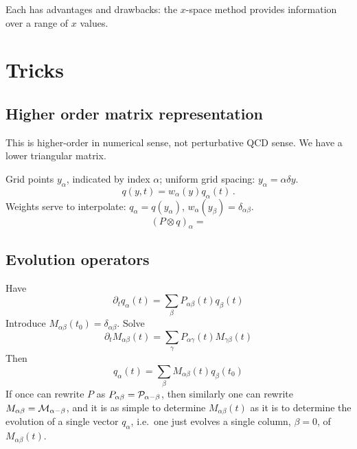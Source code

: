 \documentclass[12pt]{article}
\begin{document}
Each has advantages
and drawbacks: the $x$-space method provides information over a range
of $x$ values.

\section{Tricks}
\label{tricks}

\subsection{Higher order matrix representation}
\label{sec:highord}

This is higher-order in numerical sense, not perturbative QCD sense.
We have a lower triangular matrix.

Grid points $y_\alpha$, indicated by index $\alpha$; uniform grid
spacing: $y_\alpha = \alpha \delta y$.
\begin{equation}
  q(y,t) = w_\alpha(y) q_\alpha(t)\,.
\end{equation}
Weights serve to interpolate: $q_\alpha = q(y_\alpha)$,
$w_\alpha(y_\beta) = \delta_{\alpha\beta}$.
\begin{equation}
  (P \otimes q)_\alpha = 
\end{equation}


\subsection{Evolution operators}
\label{sec:evop}
Have
\begin{equation}
  \partial_t q_{\alpha}(t)  = \sum_{\beta} P_{\alpha\beta}(t) q_\beta(t)
\end{equation}
Introduce $M_{\alpha\beta}(t_0) = \delta_{\alpha\beta}$. Solve 
\begin{equation}
  \partial_t M_{\alpha\beta}(t)  = \sum_{\gamma} P_{\alpha\gamma}(t)
  M_{\gamma\beta}(t)
\end{equation}
Then 
\begin{equation}
  q_{\alpha}(t)  = \sum_{\beta} M_{\alpha\beta}(t) q_\beta(t_0)
\end{equation}
If once can rewrite $P$ as $P_{\alpha\beta} = \cal P_{\alpha-\beta}$,
then similarly one can rewrite $M_{\alpha\beta} = \cal
M_{\alpha-\beta}$, and it is as simple to determine
$M_{\alpha\beta}(t)$ as it is to determine the evolution of a single
vector $q_\alpha$, i.e.\ one just evolves a single column, $\beta =
0$, of $M_{\alpha\beta}(t)$.
\end{document}

